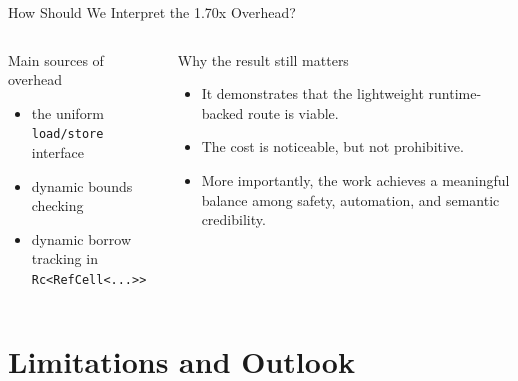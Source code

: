 \documentclass[aspectratio=169,11pt,professionalfonts]{beamer}
\begin{document}
\begin{frame}{How Should We Interpret the 1.70x Overhead?}
  \small
  \begin{columns}[T]
    \begin{block}{Main sources of overhead}
      \begin{itemize}
        \item the uniform \texttt{load/store} interface
        \item dynamic bounds checking
        \item dynamic borrow tracking in \texttt{Rc<RefCell<...>>}
      \end{itemize}
    \end{block}
    \begin{exampleblock}{Why the result still matters}
      \begin{itemize}
        \item It demonstrates that the lightweight runtime-backed route is viable.
        \item The cost is noticeable, but not prohibitive.
        \item More importantly, the work achieves a meaningful balance among safety, automation, and semantic credibility.
      \end{itemize}
    \end{exampleblock}
  \end{columns}
\end{frame}

\section{Limitations and Outlook}
\end{document}

